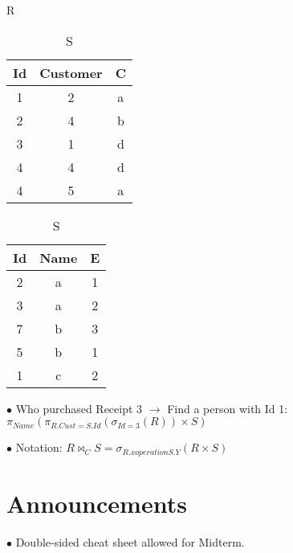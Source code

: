 \documentclass[twoside]{article}
\begin{document}
\begin{table}[!htb]
    \begin{minipage}{.5\linewidth}
      \caption{R}
      \centering
        \begin{tabular}{c|c|c}
            Id & Customer & C \\
            \hline
            1 & 2 & a \\
            2 & 4 & b \\
            3 & 1 & d \\
            4 & 4 & d \\
            4 & 5 & a \\
        \end{tabular}
    \end{minipage}
    \begin{minipage}{.25\linewidth}
      \centering
        \caption{S}
        \begin{tabular}{c|c|c}
            Id & Name & E \\
            \hline
            2 & a & 1 \\
            3 & a & 2 \\
            7 & b & 3 \\
            5 & b & 1 \\
            1 & c & 2 \\
        \end{tabular}
    \end{minipage} 
\end{table}

$\bullet$ Who purchased Receipt 3 $\longrightarrow$ Find a person with Id 1: $
\pi_{Name}(\pi_{R.Cust=S.Id}(\sigma_{Id=3}(R))\times S)$

$\bullet$ Notation: $R \bowtie_{C} S = \sigma_{R.x operation S.Y}(R \times S)$

\newpage
\hfill \break
{}

\section*{Announcements}
$\bullet$ Double-sided cheat sheet allowed for Midterm.
\end{document}
